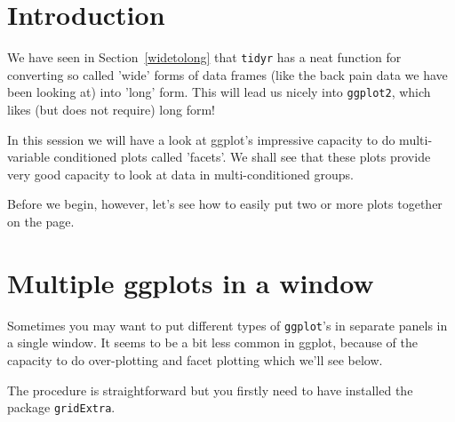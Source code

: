 \documentclass[titlepage]{book}\usepackage{knitr}
\begin{document}
 
\section{Introduction}

We have seen in Section~\ref{widetolong}  that \texttt{tidyr} has a neat function for converting so called 'wide' forms of data frames (like the back pain data we have been looking at) into 'long' form. This will lead us nicely into \texttt{ggplot2}, which likes (but does not require) long form!

In this session we will have a look at ggplot's impressive capacity to do multi-variable conditioned plots called 'facets'.  We shall see that these plots provide very good capacity to look at data in multi-conditioned groups.

Before we begin, however, let's see how to easily put two or more plots together on the page.

\section{Multiple ggplots in a window}

Sometimes you may want to put different types of \texttt{ggplot}'s in separate panels in a single window.  It seems to be a bit less common in ggplot, because of the capacity to do over-plotting and facet plotting which we'll see below. 

The procedure is straightforward but you firstly need to have installed the package \texttt{gridExtra}.


\begin{knitrout}
\color{fgcolor}\begin{kframe}
\begin{alltt}

 \hlkwb{<-} \hlstd{(}  \hlstd{(}   
 \hlkwb{<-} \hlstd{(}\hlopt{$}\hlopt{/}
 \hlkwb{<-}  \hlopt{+} \hlstd{(} 
                         \hlstd{=} \hlstd{,}
                           \hlstd{=} \hlstd{,}
                            \hlstd{=} \hlstd{)}

 \hlkwb{<-} \hlstd{(}  \hlstd{(}   
 \hlkwb{<-}  \hlopt{+} \hlstd{(} \hlstd{=} \hlstd{)}

 \hlstd{=} \hlstd{)}
\end{alltt}
\end{kframe}
\end{knitrout}
\end{document}
